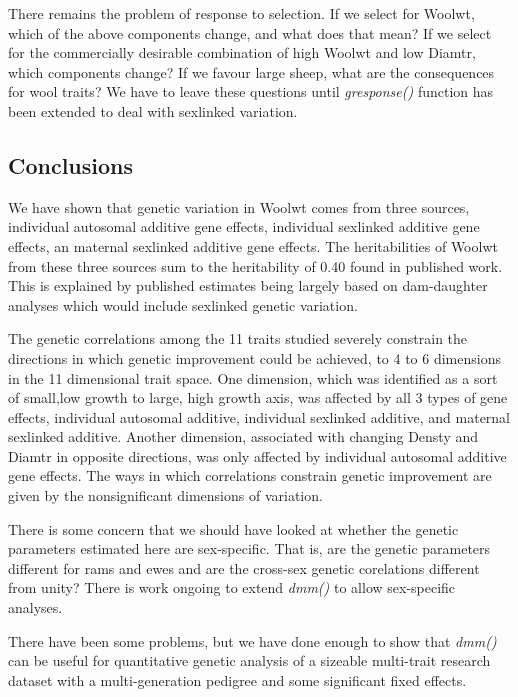 \documentclass[titlepage]{article}  %
\begin{document}
There remains the problem of response to selection. If we select for Woolwt, which of the above components change, and what does that mean? If we select for the commercially desirable combination of high Woolwt and low Diamtr, which components change? If we favour large sheep, what are the consequences for wool traits? We have to leave these questions until  {\em gresponse()} function has been extended to deal with sexlinked variation.

\subsection{Conclusions}
We have shown that genetic variation in Woolwt comes from three sources, individual autosomal additive gene effects, individual sexlinked additive gene effects, an maternal sexlinked additive gene effects. The heritabilities of Woolwt from these three sources sum to the heritability of 0.40 found in published work. This is explained by published estimates being largely based on dam-daughter analyses which would include sexlinked genetic variation.

The genetic correlations among the 11 traits studied  severely constrain the directions in which genetic improvement could be achieved, to 4 to 6 dimensions in the 11 dimensional trait space. One dimension, which was identified as a sort of small,low growth to large, high growth axis, was affected by all 3 types of gene effects, individual autosomal additive, individual sexlinked additive, and maternal sexlinked additive. Another dimension, associated with changing Densty and Diamtr in opposite directions, was only affected by individual autosomal additive gene effects.  The ways in which correlations constrain genetic improvement are given by the nonsignificant dimensions of variation.

There is some concern that we should have looked at whether the genetic parameters estimated here are sex-specific. That is, are the genetic parameters different for rams and ewes and are the cross-sex genetic corelations different from unity? There is work ongoing to extend {\em dmm()} to allow sex-specific analyses.

There have been some problems, but we have done enough to show that {\em dmm()} can be useful for quantitative genetic analysis of a sizeable multi-trait research dataset with a multi-generation pedigree and some significant fixed effects.


\clearpage
\end{document}

